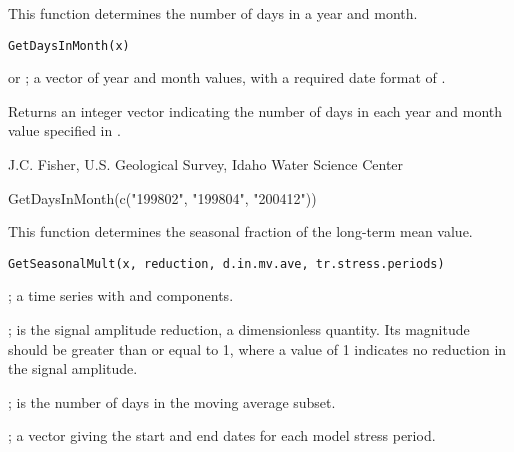 \documentclass[a4paper]{book}
\begin{document}
%
\begin{Description}\relax
This function determines the number of days in a year and month.
\end{Description}
%
\begin{Usage}
\begin{verbatim}
GetDaysInMonth(x)
\end{verbatim}
\end{Usage}
%
\begin{Arguments}
\begin{ldescription}
\item[\code{x}]  or ; a vector of year and month values, with a required date format of .
\end{ldescription}
\end{Arguments}
%
\begin{Value}
Returns an integer vector indicating the number of days in each year and month value specified in .
\end{Value}
%
\begin{Author}\relax
J.C. Fisher, U.S. Geological Survey, Idaho Water Science Center
\end{Author}
%
\begin{Examples}
\begin{ExampleCode}
GetDaysInMonth(c("199802", "199804", "200412"))
\end{ExampleCode}
\end{Examples}
%
\begin{Description}\relax
This function determines the seasonal fraction of the long-term mean value.
\end{Description}
%
\begin{Usage}
\begin{verbatim}
GetSeasonalMult(x, reduction, d.in.mv.ave, tr.stress.periods)
\end{verbatim}
\end{Usage}
%
\begin{Arguments}
\begin{ldescription}
\item[\code{x}] ; a time series with  and  components.
\item[\code{reduction}] ; is the signal amplitude reduction, a dimensionless quantity.
Its magnitude should be greater than or equal to 1, where a value of 1 indicates no reduction in the signal amplitude.
\item[\code{d.in.mv.ave}] ; is the number of days in the moving average subset.
\item[\code{tr.stress.periods}] ; a vector giving the start and end dates for each model stress period.
\end{ldescription}
\end{Arguments}
\end{document}

